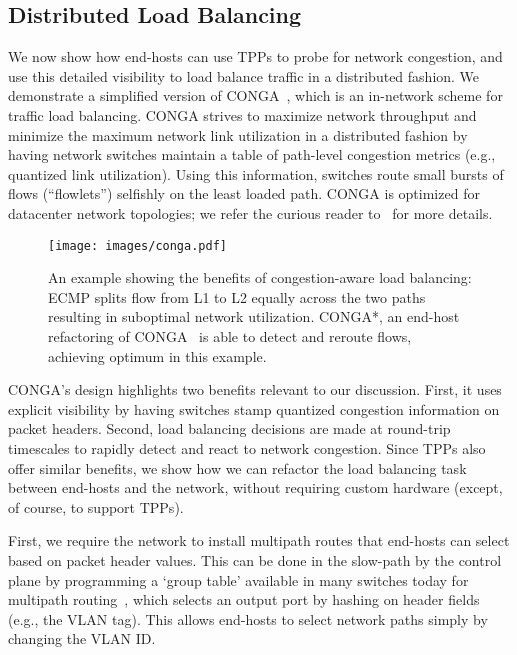 \begin{ecam}
\subsection{Distributed Load Balancing}\label{subsec:conga}
We now show how end-hosts can use
TPPs to probe for network congestion, and use this detailed visibility to load
balance traffic in a distributed fashion.  We demonstrate a simplified
version of CONGA~\cite{conga}, which is an in-network scheme for
traffic load balancing.  CONGA strives to
maximize network throughput and minimize the maximum network link
utilization in a distributed fashion
by having network switches maintain a table of path-level congestion
metrics (e.g., quantized link utilization).  Using this information,
switches route small bursts of flows (``flowlets'') selfishly
on the least loaded path.  CONGA is optimized for datacenter
network topologies; we refer the curious reader to~\cite{conga}
for more details.
\begin{figure}[t]
\centering
\texttt{[image: images/conga.pdf]}
\caption{An example showing the benefits of congestion-aware load balancing:
ECMP splits flow from L1 to L2
equally across the two paths resulting in suboptimal network utilization.
CONGA*, an end-host refactoring of CONGA~\cite{conga} is able to detect
and reroute flows, achieving optimum in this example.}
\label{fig:conga}\vspace{-1em}
\end{figure}

CONGA's design highlights two benefits relevant to our discussion.
First, it uses explicit visibility by having switches stamp quantized
congestion information on packet headers.  Second, load balancing decisions
are made at round-trip timescales to rapidly detect and react to network
congestion.  Since TPPs also offer similar benefits, we show how we
can refactor the load balancing task between end-hosts and the network,
without requiring custom hardware (except, of course, to support TPPs).

First, we require the network to install multipath routes that
end-hosts can select based on packet header values.  This can be done in
the slow-path by the control plane by programming a `group table' available
in many switches today for multipath routing~\cite[\S5.6.1]{of1.4}, which
selects an output port by hashing on header fields (e.g., the VLAN tag).
This allows end-hosts to select network paths simply by changing the VLAN ID.


\end{ecam}
